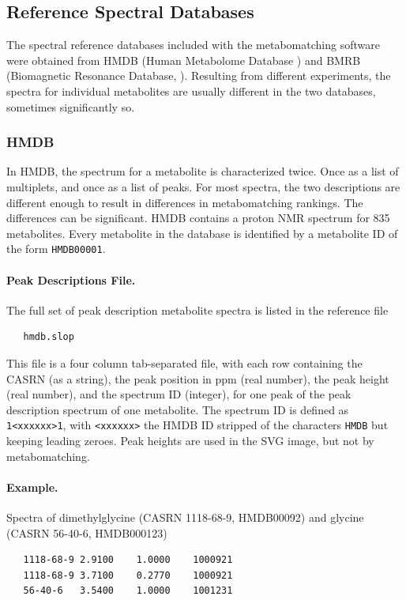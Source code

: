 \documentclass[a4paper,11pt]{article}
\begin{document}
\subsection{Reference Spectral Databases\label{sec:databases}}
The spectral reference databases included with the metabomatching software were obtained from HMDB (Human Metabolome Database \cite{}) and BMRB (Biomagnetic Resonance Database, \cite{}). Resulting from different experiments, the spectra for individual metabolites are usually different in the two databases, sometimes significantly so.
\subsubsection{HMDB}
In HMDB, the spectrum for a metabolite is characterized twice. Once as a list of multiplets, and once as a list of peaks. For most spectra, the two descriptions are different enough to result in differences in metabomatching rankings. The differences can be significant. HMDB contains a proton NMR spectrum for 835 metabolites. Every metabolite in the database is identified by a metabolite ID of the form \verb|HMDB00001|.
\paragraph{Peak Descriptions File.} The full set of peak description metabolite spectra is listed in the reference file
\begin{verbatim}
   hmdb.slop
\end{verbatim}
This file is a four column tab-separated file, with each row containing the CASRN (as a string), the peak position in ppm (real number), the peak height (real number), and the spectrum ID (integer), for one peak of the peak description spectrum of one metabolite. The spectrum ID is defined as \verb|1<xxxxxx>1|, with \verb|<xxxxxx>| the HMDB ID stripped of the characters \verb|HMDB| but keeping leading zeroes. Peak heights are used in the SVG image, but not by metabomatching.
\paragraph{Example.} Spectra of dimethylglycine (CASRN 1118-68-9, HMDB00092) and glycine (CASRN 56-40-6, HMDB000123)
\begin{verbatim}
   1118-68-9 2.9100    1.0000    1000921
   1118-68-9 3.7100    0.2770    1000921
   56-40-6   3.5400    1.0000    1001231
\end{verbatim}
\end{document}
